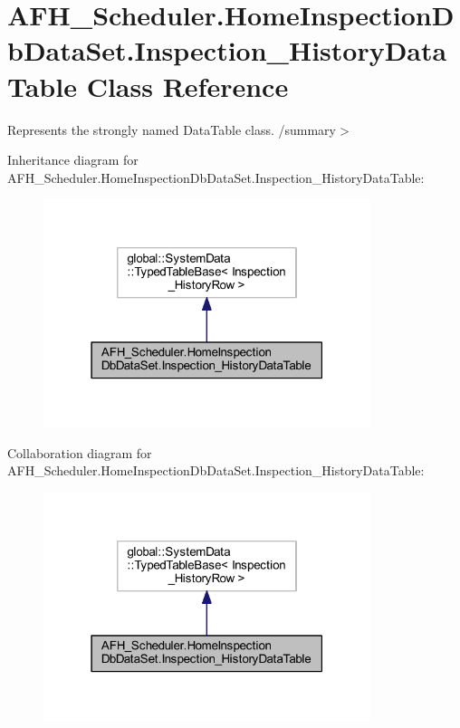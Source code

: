 \section{A\+F\+H\+\_\+\+Scheduler.\+Home\+Inspection\+Db\+Data\+Set.\+Inspection\+\_\+\+History\+Data\+Table Class Reference}
\label{class_a_f_h___scheduler_1_1_home_inspection_db_data_set_1_1_inspection___history_data_table}


Represents the strongly named Data\+Table class. /summary$>$  




Inheritance diagram for A\+F\+H\+\_\+\+Scheduler.\+Home\+Inspection\+Db\+Data\+Set.\+Inspection\+\_\+\+History\+Data\+Table\+:
\nopagebreak
\begin{figure}[H]
\begin{center}
\leavevmode
\includegraphics[width=271pt]{class_a_f_h___scheduler_1_1_home_inspection_db_data_set_1_1_inspection___history_data_table__inherit__graph}
\end{center}
\end{figure}


Collaboration diagram for A\+F\+H\+\_\+\+Scheduler.\+Home\+Inspection\+Db\+Data\+Set.\+Inspection\+\_\+\+History\+Data\+Table\+:
\nopagebreak
\begin{figure}[H]
\begin{center}
\leavevmode
\includegraphics[width=271pt]{class_a_f_h___scheduler_1_1_home_inspection_db_data_set_1_1_inspection___history_data_table__coll__graph}
\end{center}
\end{figure}
